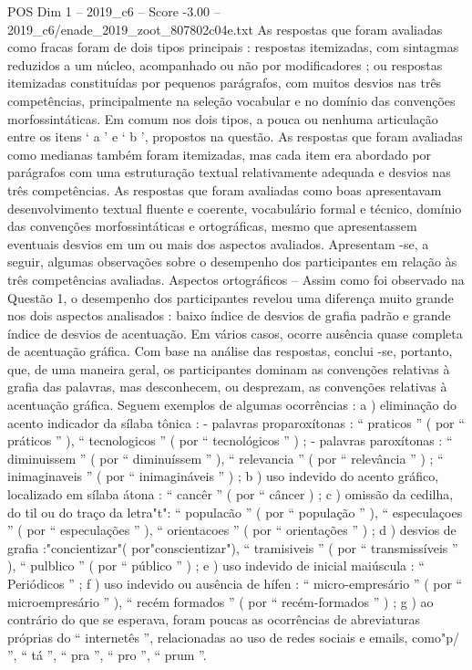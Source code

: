 \begin{textsample}{POS Dim 1 – 2019\_c6 – Score -3.00 – 2019\_c6/enade\_2019\_zoot\_807802c04e.txt}
As respostas que foram avaliadas como fracas foram de dois tipos principais : respostas itemizadas, com sintagmas reduzidos a um núcleo, acompanhado ou não por modificadores ; ou respostas itemizadas constituídas por pequenos parágrafos, com muitos desvios nas três competências, principalmente na seleção vocabular e no domínio das convenções morfossintáticas.
Em comum nos dois tipos, a pouca ou nenhuma articulação entre os itens ‘ a ’ e ‘ b ’, propostos na questão.
As respostas que foram avaliadas como medianas também foram itemizadas, mas cada item era abordado por parágrafos com uma estruturação textual relativamente adequada e desvios nas três competências.
As respostas que foram avaliadas como boas apresentavam desenvolvimento textual fluente e coerente, vocabulário formal e técnico, domínio das convenções morfossintáticas e ortográficas, mesmo que apresentassem eventuais desvios em um ou mais dos aspectos avaliados.
Apresentam -se, a seguir, algumas observações sobre o desempenho dos participantes em relação às três competências avaliadas.
Aspectos ortográficos – Assim como foi observado na Questão 1, o desempenho dos participantes revelou uma diferença muito grande nos dois aspectos analisados : baixo índice de desvios de grafia padrão e grande índice de desvios de acentuação.
Em vários casos, ocorre ausência quase completa de acentuação gráfica.
Com base na análise das respostas, conclui -se, portanto, que, de uma maneira geral, os participantes dominam as convenções relativas à grafia das palavras, mas desconhecem, ou desprezam, as convenções relativas à acentuação gráfica.
Seguem exemplos de algumas ocorrências : a ) eliminação do acento indicador da sílaba tônica : - palavras proparoxítonas : “ praticos ” ( por “ práticos ” ), “ tecnologicos ” ( por “ tecnológicos ” ) ; - palavras paroxítonas : “ diminuissem ” ( por “ diminuíssem ” ), “ relevancia ” ( por “ relevância ” ) ; “ inimaginaveis ” ( por “ inimagináveis ” ) ; b ) uso indevido do acento gráfico, localizado em sílaba átona : “ cancêr ” ( por “ câncer ) ; c ) omissão da cedilha, do til ou do traço da letra"t": “ populacão ” ( por “ população ” ), “ especulaçoes ” ( por “ especulações ” ), “ orientacoes ” ( por “ orientações ” ) ; d ) desvios de grafia :"concientizar"( por"conscientizar"), “ tramisiveis ” ( por “ transmissíveis ” ), “ pulblico ” ( por “ público ” ) ; e ) uso indevido de inicial maiúscula : “ Periódicos ” ; f ) uso indevido ou ausência de hífen : “ micro-empresário ” ( por “ microempresário ” ), “ recém formados ” ( por “ recém-formados ” ) ; g ) ao contrário do que se esperava, foram poucas as ocorrências de abreviaturas próprias do “ internetês ”, relacionadas ao uso de redes sociais e emails, como"p/ ”, “ tá ”, “ pra ”, “ pro ”, “ prum ”.

\end{textsample}
